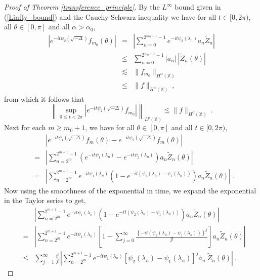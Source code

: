 \documentclass[12pt]{amsart}
\theoremstyle{definition}
\newcommand{\X}{\mathbb X}%
\numberwithin{equation}{section}
\begin{document}
\begin{proof}[Proof of Theorem \ref{transference_principle}]
By the $L^\infty$ bound given in (\ref{Linfty_bound}) and the Cauchy-Schwarz inequality we have for all $t \in [0,2\pi)$, all $\theta \in [0,\pi]$ and all $\alpha>\alpha_0$,
\begin{eqnarray*}
\left|e^{-it\psi_2\left(\sqrt{-\Delta}\right)} f_{m_0}(\theta) \right| &=& \left|\sum_{n=0}^{2^{m_0+1}-1} e^{-it\psi_2\left(\lambda_n\right)} a_n \tilde{Z}_n \right| \\
&\le & \sum_{n=0}^{2^{m_0+1}-1} |a_n|\:\left|\tilde{Z}_n(\theta)\right|\\
&\lesssim & \|f_{m_0}\|_{H^{\alpha}(\X)} \\
& \le & \|f\|_{H^{\alpha}(\X)}\:,
\end{eqnarray*}
from which it follows that
\begin{equation} \label{transference_pf_eq5}
\left\|\sup_{0 \le t < 2\pi} \left|e^{-it\psi_2\left(\sqrt{-\Delta}\right)} f_{m_0} \right|\right\|_{L^p(\X)} \lesssim  \|f\|_{H^{\alpha}(\X)}\:.
\end{equation}
Next for each $m \ge m_0+1$, we have for all $\theta \in [0,\pi]$ and all $t \in [0,2\pi)$,
\begin{eqnarray*}
&&\left|e^{-it\psi_1\left(\sqrt{-\Delta}\right)} f_m(\theta)   - e^{-it\psi_2\left(\sqrt{-\Delta}\right)} f_m(\theta) \right| \\
&=& \left|\sum_{n=2^m}^{2^{m+1}-1} \left(e^{-it\psi_1\left(\lambda_n\right)} - e^{-it\psi_2\left(\lambda_n\right)}\right) a_n \tilde{Z}_n(\theta) \right|\\
&=& \left|\sum_{n=2^m}^{2^{m+1}-1} e^{-it\psi_1\left(\lambda_n\right)}\left(1 - e^{-it\left(\psi_2\left(\lambda_n\right)-\psi_1\left(\lambda_n\right)\right)}\right) a_n \tilde{Z}_n(\theta) \right|\:.
\end{eqnarray*}
Now using the smoothness of the exponential in time, we expand the exponential in the Taylor series to get,
\begin{eqnarray*}
&&\left|\sum_{n=2^m}^{2^{m+1}-1} e^{-it\psi_1\left(\lambda_n\right)}\left(1 - e^{-it\left(\psi_2\left(\lambda_n\right)-\psi_1\left(\lambda_n\right)\right)}\right) a_n \tilde{Z}_n(\theta) \right| \\
&=& \left|\sum_{n=2^m}^{2^{m+1}-1} e^{-it\psi_1\left(\lambda_n\right)}\left[1 - \sum_{j=0}^\infty \frac{\left\{-it\left(\psi_2\left(\lambda_n\right)-\psi_1\left(\lambda_n\right)\right)\right\}^j}{j!}\right]
a_n \tilde{Z}_n(\theta) \right|\\
& \le & \sum_{j=1}^\infty \frac{t^j}{j!} \left|\sum_{n=2^m}^{2^{m+1}-1}e^{-it\psi_1\left(\lambda_n\right)} \left[\psi_2(\lambda_n)-\psi_1(\lambda_n)\right]^j a_n\:\tilde{Z}_n(\theta)\right|\:.

\end{eqnarray*}
\end{proof}
\end{document}

